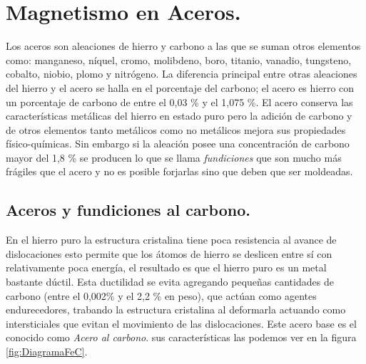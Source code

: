
\chapter{Magnetismo en Aceros.} %

\label{AppendixMagnetismoEnAceros} %




Los aceros son aleaciones de hierro y carbono a las que se suman otros elementos como: manganeso, níquel, cromo, molibdeno, boro, titanio, vanadio, tungsteno, cobalto, niobio, plomo y nitrógeno. La diferencia principal entre otras aleaciones del hierro y el acero se halla en el porcentaje del carbono; el acero es hierro con un porcentaje de carbono de entre el 0,03 \% y el 1,075 \%. El acero conserva las características metálicas del hierro en estado puro pero la adición de carbono y de otros elementos tanto metálicos como no metálicos mejora sus propiedades físico-químicas. Sin embargo si la aleación posee una concentración de carbono mayor del 1,8 \% se producen lo que se llama \emph{fundiciones} que son mucho más frágiles que el acero y no es posible forjarlas sino que deben que ser moldeadas.



\section{Aceros y fundiciones al carbono.}

En el hierro puro la estructura cristalina tiene poca resistencia al avance de dislocaciones esto permite que los átomos de hierro se deslicen entre sí con relativamente poca energía, el resultado es que el hierro puro es un metal bastante dúctil. Esta ductilidad se evita agregando pequeñas cantidades de carbono (entre el 0,002\% y el 2,2 \% en peso), que actúan como agentes endurecedores, trabando la estructura cristalina al deformarla actuando como intersticiales que evitan el movimiento de las dislocaciones. Este acero base es el conocido como \emph{Acero al carbono}. sus características las podemos ver en la figura \ref{fig:DiagramaFeC}.

